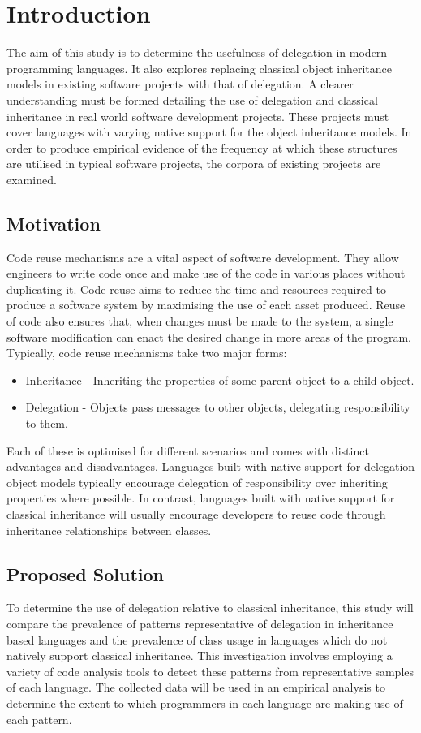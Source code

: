 \chapter{Introduction}\label{C:intro}
The aim of this study is to determine the usefulness of delegation in modern programming languages. It also explores replacing classical object inheritance models in existing software projects with that of delegation. A clearer understanding must be formed detailing the use of delegation and classical inheritance in real world software development projects. These projects must cover languages with varying native support for the object inheritance models. In order to produce empirical evidence of the frequency at which these structures are utilised in typical software projects, the corpora of existing projects are examined.

\section{Motivation}
Code reuse mechanisms are a vital aspect of software development. They allow engineers to write code once and make use of the code in various places without duplicating it. Code reuse aims to reduce the time and resources required to produce a software system by maximising the use of each asset produced. Reuse of code also ensures that, when changes must be made to the system, a single software modification can enact the desired change in more areas of the program.
\newline
Typically, code reuse mechanisms take two major forms:
\begin{itemize}
	\item Inheritance - Inheriting the properties of some parent object to a child object.
	\item Delegation - Objects pass messages to other objects, delegating responsibility to them.
\end{itemize}
Each of these is optimised for different scenarios and comes with distinct advantages and disadvantages. Languages built with native support for delegation object models typically encourage delegation of responsibility over inheriting properties where possible. In contrast, languages built with native support for classical inheritance will usually encourage developers to reuse code through inheritance relationships between classes.

\section{Proposed Solution}
To determine the use of delegation relative to classical inheritance, this study will compare the prevalence of patterns representative of delegation in inheritance based languages and the prevalence of class usage in languages which do not natively support classical inheritance. This investigation involves employing a variety of code analysis tools to detect these patterns from representative samples of each language. The collected data will be used in an empirical analysis to determine the extent to which programmers in each language are making use of each pattern.

